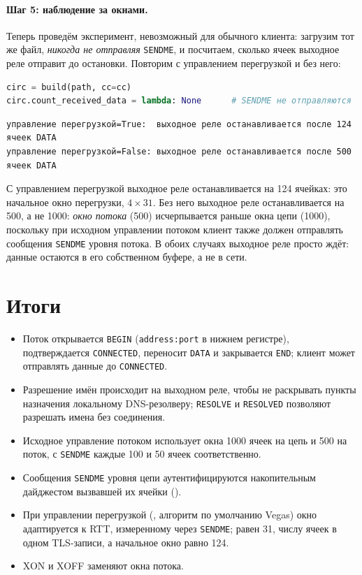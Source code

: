\paragraph{Шаг 5: наблюдение за окнами.} Теперь проведём эксперимент, невозможный для обычного клиента: загрузим тот же файл, \emph{никогда не отправляя} \texttt{SENDME}, и посчитаем, сколько ячеек выходное реле отправит до остановки. Повторим с управлением перегрузкой и без него:
\begin{lstlisting}[language=Python]
circ = build(path, cc=cc)
circ.count_received_data = lambda: None      # SENDME не отправляются
\end{lstlisting}
\begin{lstlisting}[numbers=none]
управление перегрузкой=True:  выходное реле останавливается после 124 ячеек DATA
управление перегрузкой=False: выходное реле останавливается после 500 ячеек DATA
\end{lstlisting}
С управлением перегрузкой выходное реле останавливается на 124 ячейках: это начальное окно перегрузки, $4 \times 31$. Без него выходное реле останавливается на 500, а не 1000: \emph{окно потока} (500) исчерпывается раньше окна цепи (1000), поскольку при исходном управлении потоком клиент также должен отправлять сообщения \texttt{SENDME} уровня потока. В обоих случаях выходное реле просто ждёт: данные остаются в его собственном буфере, а не в сети.

\section*{Итоги}
\begin{itemize}
  \item Поток открывается \texttt{BEGIN} (\texttt{address:port} в нижнем регистре), подтверждается \texttt{CONNECTED}, переносит \texttt{DATA} и закрывается \texttt{END}; клиент может отправлять данные до \texttt{CONNECTED}.
  \item Разрешение имён происходит на выходном реле, чтобы не раскрывать пункты назначения локальному DNS-резолверу; \texttt{RESOLVE} и \texttt{RESOLVED} позволяют разрешать имена без соединения.
  \item Исходное управление потоком использует окна 1000 ячеек на цепь и 500 на поток, с \texttt{SENDME} каждые 100 и 50 ячеек соответственно.
  \item Сообщения \texttt{SENDME} уровня цепи аутентифицируются накопительным дайджестом вызвавшей их ячейки ().
  \item При управлении перегрузкой (, алгоритм по умолчанию Vegas) окно адаптируется к RTT, измеренному через \texttt{SENDME};  равен 31, числу ячеек в одном TLS-записи, а начальное окно равно 124.
  \item XON и XOFF заменяют окна потока.
\end{itemize}

